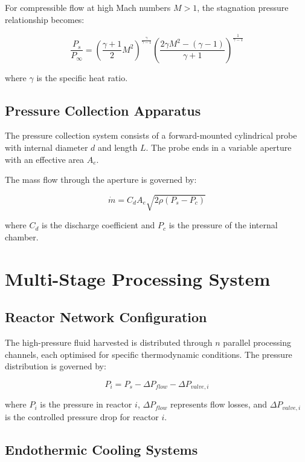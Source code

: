 \documentclass[12pt,a4paper]{article}
\begin{document}
For compressible flow at high Mach numbers $M > 1$, the stagnation pressure relationship becomes:

\begin{equation}
\frac{P_s}{P_\infty} = \left(\frac{\gamma + 1}{2}M^2\right)^{\frac{\gamma}{\gamma-1}} \left(\frac{2\gamma M^2 - (\gamma-1)}{\gamma + 1}\right)^{\frac{1}{\gamma-1}}
\end{equation}

where $\gamma$ is the specific heat ratio.

\subsection{Pressure Collection Apparatus}

The pressure collection system consists of a forward-mounted cylindrical probe with internal diameter $d$ and length $L$. The probe ends in a variable aperture with an effective area $A_e$.

The mass flow through the aperture is governed by:

\begin{equation}
\dot{m} = C_d A_e \sqrt{2\rho(P_s - P_c)}
\end{equation}

where $C_d$ is the discharge coefficient and $P_c$ is the pressure of the internal chamber.

\section{Multi-Stage Processing System}

\subsection{Reactor Network Configuration}

The high-pressure fluid harvested is distributed through $n$ parallel processing channels, each optimised for specific thermodynamic conditions. The pressure distribution is governed by:

\begin{equation}
P_i = P_s - \Delta P_{flow} - \Delta P_{valve,i}
\end{equation}

where $P_i$ is the pressure in reactor $i$, $\Delta P_{flow}$ represents flow losses, and $\Delta P_{valve,i}$ is the controlled pressure drop for reactor $i$.

\subsection{Endothermic Cooling Systems}
\end{document}
